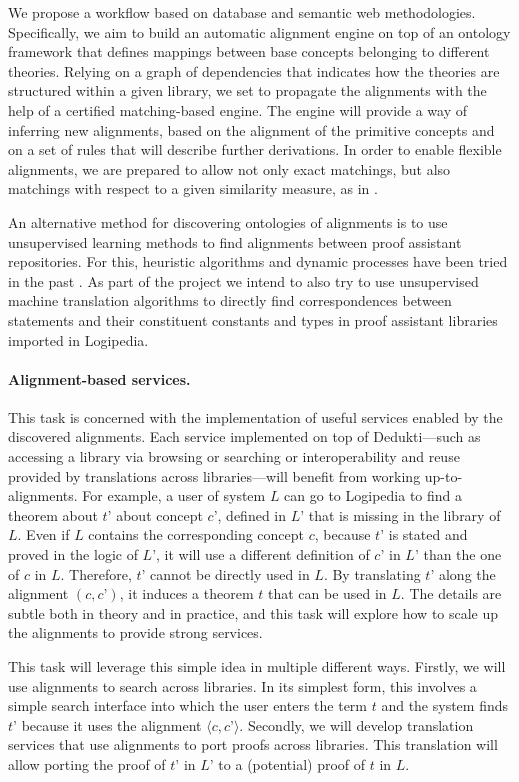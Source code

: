 We propose a workflow based on database and semantic web
methodologies. Specifically, we aim to build an automatic alignment
engine on top of an ontology framework that defines mappings between
base concepts belonging to different theories. Relying on a graph of
dependencies that indicates how the theories are structured within a
given library, we set to propagate the alignments with the help of a
certified matching-based engine. The engine will provide a way of
inferring new alignments, based on the alignment of the primitive
concepts and on a set of rules that will describe further
derivations. In order to enable flexible alignments, we are prepared
to allow not only exact matchings, but also matchings with respect to
a given similarity measure, as in \cite{???}.

An alternative method for discovering ontologies of alignments is to
use unsupervised learning methods to find alignments between proof
assistant repositories. For this, heuristic algorithms and dynamic
processes have been tried in the past \cite{???}.  As part of the
project we intend to also try to use unsupervised machine translation
algorithms \cite{???} to directly find correspondences between
statements and their constituent constants and types in proof
assistant libraries imported in Logipedia.

\paragraph*{Alignment-based services.}
This task is concerned with the implementation of useful services
enabled by the discovered alignments. Each service implemented on top
of Dedukti---such as accessing a library via browsing or searching or
interoperability and reuse provided by translations across
libraries---will benefit from working up-to-alignments. For example, a
user of system $L$ can go to Logipedia to find a theorem about $t’$
about concept $c’$, defined in $L’$ that is missing in the library of
$L$. Even if $L$ contains the corresponding concept $c$, because $t’$
is stated and proved in the logic of $L’$, it will use a different
definition of $c’$ in $L’$ than the one of $c$ in $L$.  Therefore,
$t’$ cannot be directly used in $L$. By translating $t’$ along the
alignment $(c,c’)$, it induces a theorem $t$ that can be used in
$L$. The details are subtle both in theory and in practice, and this
task will explore how to scale up the alignments to provide strong
services.

This task will leverage this simple idea in multiple different
ways. Firstly, we will use alignments to search across libraries. In
its simplest form, this involves a simple search interface into which
the user enters the term $t$ and the system finds $t’$ because it uses
the alignment $\langle c,c’\rangle$. Secondly, we will develop
translation services that use alignments to port proofs across
libraries. This translation will allow porting the proof of $t’$ in
$L’$ to a (potential) proof of $t$ in $L$.


